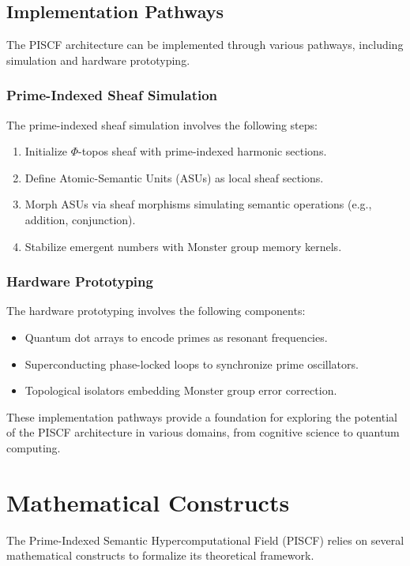 \documentclass{article}
\theoremstyle{plain}
\begin{document}
\subsection{Implementation Pathways}

The PISCF architecture can be implemented through various pathways, including simulation and hardware prototyping.

\subsubsection{Prime-Indexed Sheaf Simulation}

The prime-indexed sheaf simulation involves the following steps:
\begin{enumerate}
    \item Initialize $\Phi$-topos sheaf with prime-indexed harmonic sections.
    \item Define Atomic-Semantic Units (ASUs) as local sheaf sections.
    \item Morph ASUs via sheaf morphisms simulating semantic operations (e.g., addition, conjunction).
    \item Stabilize emergent numbers with Monster group memory kernels.
\end{enumerate}

\subsubsection{Hardware Prototyping}

The hardware prototyping involves the following components:
\begin{itemize}
    \item Quantum dot arrays to encode primes as resonant frequencies.
    \item Superconducting phase-locked loops to synchronize prime oscillators.
    \item Topological isolators embedding Monster group error correction.
\end{itemize}

These implementation pathways provide a foundation for exploring the potential of the PISCF architecture in various domains, from cognitive science to quantum computing.

\section{Mathematical Constructs}

The Prime-Indexed Semantic Hypercomputational Field (PISCF) relies on several mathematical constructs to formalize its theoretical framework.
\end{document}
